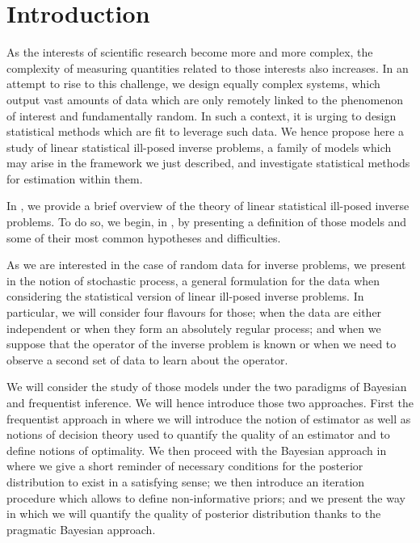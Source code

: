 \documentclass[a4paper,11pt]{book}
\begin{document}
\frontmatter

%
\tableofcontents
%
%
\mainmatter

\pagestyle{fancy}
\chapter*{Introduction}\label{INTRO}
As the interests of scientific research become more and more complex, the complexity of measuring quantities related to those interests also increases.
In an attempt to rise to this challenge, we design equally complex systems, which output vast amounts of data which are only remotely linked to the phenomenon of interest and fundamentally random.
In such a context, it is urging to design statistical methods which are fit to leverage such data.
We hence propose here a study of linear statistical ill-posed inverse problems, a family of models which may arise in the framework we just described, and investigate statistical methods for estimation within them.

\medskip

In , we provide a brief overview of the theory of linear statistical ill-posed inverse problems.
To do so, we begin, in , by presenting a definition of those models and some of their most common hypotheses and difficulties.

As we are interested in the case of random data for inverse problems, we present in  the notion of stochastic process, a general formulation for the data when considering the statistical version of linear ill-posed inverse problems.
In particular, we will consider four flavours for those; when the data are either independent or when they form an absolutely regular process; and when we suppose that the operator of the inverse problem is known or when we need to observe a second set of data to learn about the operator.

We will consider the study of those models under the two paradigms of Bayesian and frequentist inference.
We will hence introduce those two approaches.
First the frequentist approach in  where we will introduce the notion of estimator as well as notions of decision theory used to quantify the quality of an estimator and to define notions of optimality.
We then proceed with the Bayesian approach in  where we give a short reminder of necessary conditions for the posterior distribution to exist in a satisfying sense; we then introduce an iteration procedure which allows to define non-informative priors; and we present the way in which we will quantify the quality of posterior distribution thanks to the pragmatic Bayesian approach.
\end{document}
